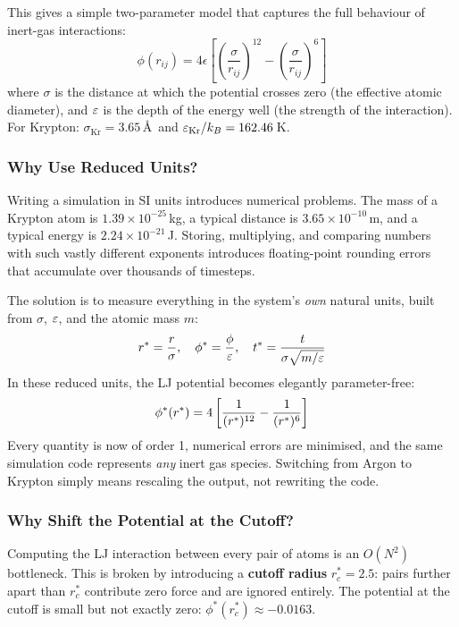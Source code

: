 This gives a simple two-parameter model that captures the full behaviour of inert-gas interactions:
\begin{equation}
    \phi(r_{ij}) = 4\epsilon \left[\left(\frac{\sigma}{r_{ij}}\right)^{12} - \left(\frac{\sigma}{r_{ij}}\right)^{6}\right]
    \label{eq:lj_real}
\end{equation}
where $\sigma$ is the distance at which the potential crosses zero (the effective atomic diameter), and $\varepsilon$ is the depth of the energy well (the strength of the interaction). For Krypton: $\sigma_\text{Kr} = 3.65$\,\AA\ and $\varepsilon_\text{Kr}/k_B = 162.46$\,K.

\subsubsection{Why Use Reduced Units?}

Writing a simulation in SI units introduces numerical problems. The mass of a Krypton atom is $1.39 \times 10^{-25}$\,kg, a typical distance is $3.65 \times 10^{-10}$\,m, and a typical energy is $2.24 \times 10^{-21}$\,J. Storing, multiplying, and comparing numbers with such vastly different exponents introduces floating-point rounding errors that accumulate over thousands of timesteps.

The solution is to measure everything in the system's \emph{own} natural units, built from $\sigma$, $\varepsilon$, and the atomic mass $m$:
\begin{equation}
    r^* = \frac{r}{\sigma}, \quad
    \phi^* = \frac{\phi}{\varepsilon}, \quad
    t^* = \frac{t}{\sigma\sqrt{m/\varepsilon}}
    \label{eq:reduced_units}
\end{equation}
In these reduced units, the LJ potential becomes elegantly parameter-free:
\begin{equation}
    \phi^*(r^{*}) = 4\left[\frac{1}{(r^{*})^{12}} - \frac{1}{(r^{*})^{6}}\right]
    \label{eq:lj_reduced}
\end{equation}
Every quantity is now of order 1, numerical errors are minimised, and the same simulation code represents \emph{any} inert gas species. Switching from Argon to Krypton simply means rescaling the output, not rewriting the code.

\subsubsection{Why Shift the Potential at the Cutoff?}

Computing the LJ interaction between every pair of atoms is an $O(N^2)$ bottleneck. This is broken by introducing a \textbf{cutoff radius} $r_c^* = 2.5$: pairs further apart than $r_c^*$ contribute zero force and are ignored entirely. The potential at the cutoff is small but not exactly zero: $\phi^*(r_c^*) \approx -0.0163$.

